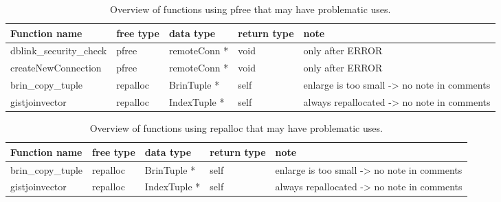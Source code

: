 \begin{table}[h]
\centering
\begin{tabularx}{\linewidth}{}
Function name & free type & data type & return type & note\\
\hline
dblink_security_check & pfree & remoteConn *& void & only after ERROR\\
createNewConnection & pfree & remoteConn *& void & only after ERROR\\
brin_copy_tuple & repalloc & BrinTuple *&self&enlarge is too small -> no note in comments\\
gistjoinvector & repalloc & IndexTuple *&self&always repallocated -> no note in comments\\

\end{tabularx}
\caption{Overview of functions using pfree that may have problematic uses.}
\label{tab:overview:functions:pfree}
\end{table}

\begin{table}[h]
\centering
\begin{tabularx}{\linewidth}{}
Function name & free type & data type & return type & note\\
\hline
brin_copy_tuple & repalloc & BrinTuple *&self&enlarge is too small -> no note in comments\\
gistjoinvector & repalloc & IndexTuple *&self&always repallocated -> no note in comments\\

\end{tabularx}
\caption{Overview of functions using repalloc that may have problematic uses.}
\label{tab:overview:functions:repalloc}
\end{table}
